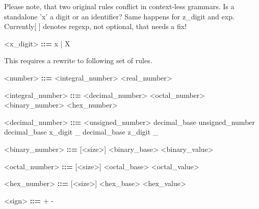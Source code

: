 \documentclass{article}
\begin{document}
{ Please note, that two original rules conflict in context-less grammars. Is a standalone 'x' a digit or an identifier?
Same happens for z_digit and exp. Currently[ ] denotes regexp, not optional, that needs a fix!

\begin{grammar}
    <x_digit> \textbf{::=} x | X
\end{grammar}


{ This requires a rewrite to following set of rules. }

\begin{grammar}
    <number> \textbf{::=} <integral_number>
                          \alt <real_number>
\end{grammar}

\begin{grammar}
<integral_number> \textbf{::=} <decimal_number>
                               \alt <octal_number>
                               \alt <binary_number>
                               \alt <hex_number>
\end{grammar}

\begin{grammar}
<decimal_number> \textbf{::=} <unsigned_number>
                              \alt [ size ] decimal_base unsigned_number
                              \alt [ size ] decimal_base x_digit { _ }
                              \alt [ size ] decimal_base z_digit { _ }
\end{grammar}

\begin{grammar}
    <binary_number> \textbf{::=} [<size>] <binary_base> <binary_value>
\end{grammar}

\begin{grammar}
    <octal_number> \textbf{::=} [<size>] <octal_base> <octal_value>
\end{grammar}

\begin{grammar}
    <hex_number> \textbf{::=} [<size>] <hex_base> <hex_value>
\end{grammar}

\begin{grammar}
    <sign> \textbf{::=} + \alt -
\end{grammar}

}
\end{document}
